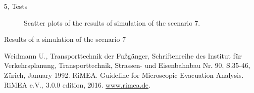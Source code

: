 \documentclass[10pt,a4paper]{article}
\begin{document}
\begin{task}{5, Tests}
\begin{figure} [H]
 \centering
 \caption{Scatter plots of the results of simulation of the scenario 7.}
 \label{scatter_plots}
\end{figure}

\begin{table}[H]\centering
    \caption[position=bottom]{Results of a simulation of the scenario 7}\label{pedestrian_recordings}
\end{table}

\end{task}

\begin{thebibliography}{9}
Weidmann U., Transporttechnik der Fußgänger, Schriftenreihe des Institut für Verkehrsplanung, Transporttechnik, Strassen- und Eisenbahnbau Nr. 90, S.35-46, Zürich, January 1992.
RiMEA. Guideline for Microscopic Evacuation Analysis. RiMEA e.V., 3.0.0 edition, 2016. \url{www.rimea.de}.
\end{thebibliography}
\end{document}
